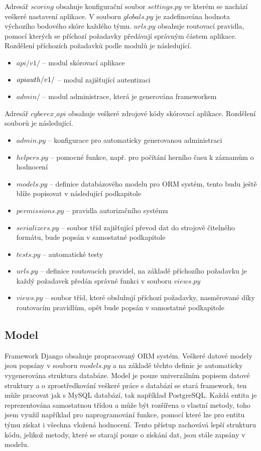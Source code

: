 \documentclass[
  digital, %
  twoside, %
  table,   %
  lof,     %
  lot,     %
]{fithesis3}
\begin{document}
Adresář $scoring$ obsahuje konfigurační soubor $settings.py$ ve kterém se nachází veškeré nastavení aplikace. V souboru $globals.py$ je zadefinována hodnota výchozího bodového skóre každého týmu. $urls.py$ obsahuje routovací pravidla, pomocí kterých se příchozí požadavky předávají správným částem aplikace. Rozdělení příchozích požadavků podle modulů je následující.

\begin{itemize}
    \item $api/v1/$ -- modul skórovací aplikace
    \item $api\-auth/v1/$ -- modul zajišťující autentizaci
    \item $admin/$ -- modul administrace, která je generována frameworkem
\end{itemize}

Adresář $cyberex\_api$ obsahuje veškeré zdrojové kódy skórovací aplikace. Rozdělení souborů je následující.

\begin{itemize}
    \item $admin.py$ -- konfigurace pro automaticky generovanou administraci
    \item $helpers.py$ -- pomocné funkce, např. pro počítání herního času k záznamům o hodnocení
    \item $models.py$ -- definice databázového modelu pro ORM systém, tento budu ještě blíže popisovat v následující podkapitole
    \item $permissions.py$ -- pravidla autorizačního systému
    \item $serializers.py$ -- soubor tříd zajišťující převod dat do strojově čitelného formátu, bude popsán v samostatné podkapitole
    \item $tests.py$ -- automatické testy
    \item $urls.py$ -- definice routovacích pravidel, na základě příchozího požadavku je každý požadavek předán správné funkci v souboru $views.py$
    \item $views.py$ -- soubor tříd, které obsluhují příchozí požadavky, nasměrované díky routovacím pravidlům, opět bude popsán v samostatné podkapitole
\end{itemize}

\subsection{Model}
Framework Django obsahuje propracovaný ORM systém. Veškeré datové modely jsou popsány v souboru $models.py$ a na základě těchto definic je automaticky vygenerována struktura databáze. Model je pouze univerzálním popisem datové struktury a o zprostředkování veškeré práce s databází se stará framework, ten může pracovat jak s MySQL databází, tak například PostgreSQL. Každá entita je reprezentována samostatnou třídou a může být rozšířena o vlastní metody, toho jsem využil například pro naprogramování funkce, pomocí které lze pro entitu týmu získat i všechna vložená hodnocení. Tento přístup zachovává lepší strukturu kódu, jelikož metody, které se starají pouze o získání dat, jsou stále zapsány v modelu.
\end{document}
